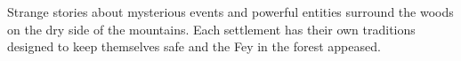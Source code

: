 Strange stories about mysterious events and powerful entities surround the woods on the dry side of the mountains.
Each settlement has their own traditions designed to keep themselves safe and the Fey in the forest appeased.
